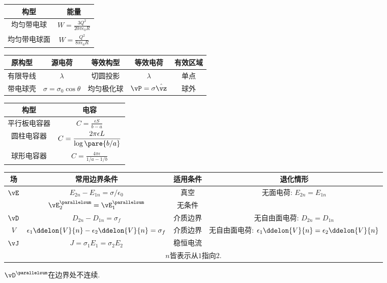 \documentclass{ctexart}
\begin{document}
\begin{longtable}{|c|c|}
	\hline
	构型 & 能量 \\
	\hline
	均匀带电球 & $\displaystyle W = \frac{3Q^2}{20\pi\epsilon_0 R}$\\
	\hline
	均匀带电球面 & $\displaystyle W = \frac{Q^2}{8\pi\epsilon_0 R}$\\
	\hline
\end{longtable}

\begin{longtable}{|c|c|c|c|c|}
	\hline
	原构型 & 源电荷 & 等效构型 & 等效电荷 & 有效区域 \\
	\hline
	有限导线 & $\lambda$ & 切圆投影 & $\lambda$ & 单点 \\
	\hline
	带电球壳 & $\sigma=\sigma_0\cos\theta$ & 均匀极化球 & $\vP = \sigma\hat{\vz}$ & 球外\\
	\hline
\end{longtable}

\begin{longtable}{|c|c|}
	\hline
	构型 & 电容\\
	\hline
	平行板电容器 & $\displaystyle C = \frac{\epsilon S}{b-a}$\\
	\hline
	圆柱电容器 & $\displaystyle C = \frac{2\pi\epsilon L}{\log\pare{b/a}}$\\
	\hline
	球形电容器 & $\displaystyle C = \frac{4\pi\epsilon}{1/a-1/b}$\\
	\hline
\end{longtable}

\begin{longtable}{|c|c|c|c|}
	\hline
	场 & 常用边界条件 & 适用条件 & 退化情形 \\
	\hline
	\multirow{2}{*}{$\vE$} & $E_{2n} - E_{1n} = \sigma/\epsilon_0$ & 真空 & 无面电荷: $E_{2n} = E_{1n}$ \\
	& $\vE_2^{\parallelsum}=\vE_1^{\parallelsum}$ & 无条件 & \\
	\hline
	$\vD$ & $D_{2n} - D_{1n} = \sigma_f$ & 介质边界 & 无自由面电荷: $D_{2n} = D_{1n}$ \\
	\hline
	\multirow{2}{*}{$V$} & \multirow{2}{*}{$\displaystyle \epsilon_1\ddelon{V}{n} - \epsilon_2\ddelon{V}{n} = \sigma_f$} & \multirow{2}{*}{介质边界} & \multirow{2}{*}{无自由面电荷: $\displaystyle \epsilon_1\ddelon{V}{n} = \epsilon_2\ddelon{V}{n}$} \\
	& & & \\
	\hline
	$\vJ$ & $J=\sigma_1 E_{1} = \sigma_2 E_{2}$ & 稳恒电流 & \\
	\hline
	\multicolumn{4}{|c|}{$n$皆表示从$1$指向$2$.} \\
	\hline
\end{longtable}
\begin{pitfall}
	$\vD^{\parallelsum}$在边界处不连续.
\end{pitfall}
\end{document}
